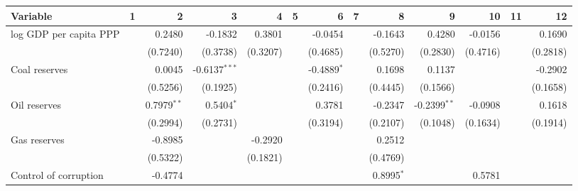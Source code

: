 \begin{tabular}{lrrrrrrrrrrrr}
\toprule
                  Variable &                1 &               2 &                  3 &         4 &              5 &              6 &                 7 &               8 &                9 &              10 &        11 &        12 \\
\midrule
    log GDP per capita PPP &                  &          0.2480 &            -0.1832 &    0.3801 &                &        -0.0454 &                   &         -0.1643 &           0.4280 &         -0.0156 &           &    0.1690 \\
                           &                  &        (0.7240) &           (0.3738) &  (0.3207) &                &       (0.4685) &                   &        (0.5270) &         (0.2830) &        (0.4716) &           &  (0.2818) \\
             Coal reserves &                  &          0.0045 &  -0.6137$^{* * *}$ &           &                &  -0.4889$^{*}$ &                   &          0.1698 &           0.1137 &                 &           &   -0.2902 \\
                           &                  &        (0.5256) &           (0.1925) &           &                &       (0.2416) &                   &        (0.4445) &         (0.1566) &                 &           &  (0.1658) \\
              Oil reserves &                  &  0.7979$^{* *}$ &       0.5404$^{*}$ &           &                &         0.3781 &                   &         -0.2347 &  -0.2399$^{* *}$ &         -0.0908 &           &    0.1618 \\
                           &                  &        (0.2994) &           (0.2731) &           &                &       (0.3194) &                   &        (0.2107) &         (0.1048) &        (0.1634) &           &  (0.1914) \\
              Gas reserves &                  &         -0.8985 &                    &   -0.2920 &                &                &                   &          0.2512 &                  &                 &           &           \\
                           &                  &        (0.5322) &                    &  (0.1821) &                &                &                   &        (0.4769) &                  &                 &           &           \\
     Control of corruption &                  &         -0.4774 &                    &           &                &                &                   &    0.8995$^{*}$ &                  &          0.5781 &           &           \\

\end{tabular}

